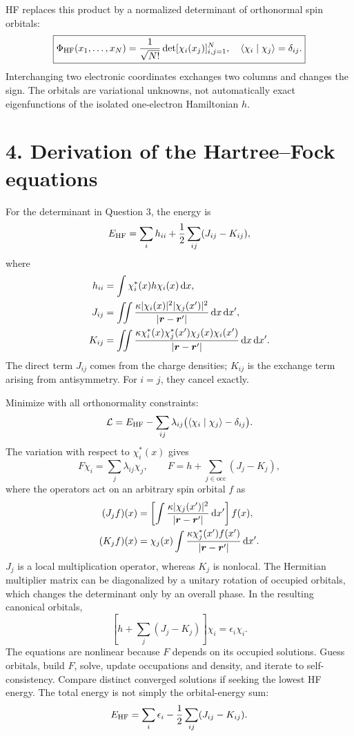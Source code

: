 HF replaces this product by a normalized determinant of orthonormal spin orbitals:
\[
\boxed{\Phi_{\rm HF}(x_1,\ldots,x_N)=\frac1{\sqrt{N!}}
\det[\chi_i(x_j)]_{i,j=1}^N,\quad \langle\chi_i\mid\chi_j\rangle=\delta_{ij}.}
\]
Interchanging two electronic coordinates exchanges two columns and changes the sign. The orbitals are variational unknowns, not automatically exact eigenfunctions of the isolated one-electron Hamiltonian $h$.

\section*{4. Derivation of the Hartree--Fock equations}
For the determinant in Question 3, the energy is
\[
E_{\rm HF}=\sum_i h_{ii}+\frac12\sum_{ij}(J_{ij}-K_{ij}),
\]
where
\begin{align*}
h_{ii}&=\int\chi_i^*(x)h\chi_i(x)\mathop{}\!\mathrm{d} x,\\
J_{ij}&=\iint\frac{\kappa|\chi_i(x)|^2|\chi_j(x')|^2}
{|\boldsymbol{r}-\boldsymbol{r}'|}\mathop{}\!\mathrm{d} x\mathop{}\!\mathrm{d} x',\\
K_{ij}&=\iint\frac{\kappa\chi_i^*(x)\chi_j^*(x')\chi_j(x)\chi_i(x')}
{|\boldsymbol{r}-\boldsymbol{r}'|}\mathop{}\!\mathrm{d} x\mathop{}\!\mathrm{d} x'.
\end{align*}
The direct term $J_{ij}$ comes from the charge densities; $K_{ij}$ is the exchange term arising from antisymmetry. For $i=j$, they cancel exactly.

Minimize with all orthonormality constraints:
\[
\mathcal L=E_{\rm HF}-\sum_{ij}\lambda_{ij}
\bigl(\langle\chi_i\mid\chi_j\rangle-\delta_{ij}\bigr).
\]
The variation with respect to $\chi_i^*(x)$ gives
\[
F\chi_i=\sum_j\lambda_{ij}\chi_j,\qquad
F=h+\sum_{j\in\mathrm{occ}}(J_j-K_j),
\]
where the operators act on an arbitrary spin orbital $f$ as
\begin{align*}
(J_jf)(x)&=\left[\int\frac{\kappa|\chi_j(x')|^2}{|\boldsymbol{r}-\boldsymbol{r}'|}\mathop{}\!\mathrm{d} x'\right]f(x),\\
(K_jf)(x)&=\chi_j(x)\int\frac{\kappa\chi_j^*(x')f(x')}{|\boldsymbol{r}-\boldsymbol{r}'|}\mathop{}\!\mathrm{d} x'.
\end{align*}
$J_j$ is a local multiplication operator, whereas $K_j$ is nonlocal. The Hermitian multiplier matrix can be diagonalized by a unitary rotation of occupied orbitals, which changes the determinant only by an overall phase. In the resulting canonical orbitals,
\[
\boxed{\left[h+\sum_j(J_j-K_j)\right]\chi_i=\epsilon_i\chi_i.}
\]
The equations are nonlinear because $F$ depends on its occupied solutions. Guess orbitals, build $F$, solve, update occupations and density, and iterate to self-consistency. Compare distinct converged solutions if seeking the lowest HF energy. The total energy is not simply the orbital-energy sum:
\[
E_{\rm HF}=\sum_i\epsilon_i-\frac12\sum_{ij}(J_{ij}-K_{ij}).
\]

